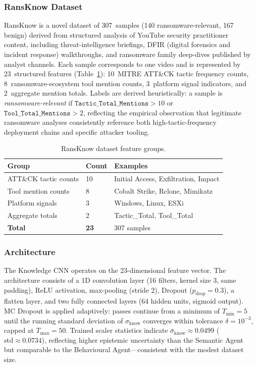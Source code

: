 \documentclass[journal]{IEEEtran}
\newcommand{\know}{\mathrm{know}}
\begin{document}
\subsubsection{RansKnow Dataset}
RansKnow is a novel dataset of 307~samples (140 ransomware-relevant,
167 benign) derived from structured analysis of YouTube security
practitioner content, including threat-intelligence briefings, DFIR
(digital forensics and incident response) walkthroughs, and
ransomware family deep-dives published by analyst channels.
Each sample corresponds to one video and is represented by
23~structured features (Table~\ref{tab:ransknow_features}):
10~MITRE ATT\&CK tactic frequency counts, 8~ransomware-ecosystem
tool mention counts, 3~platform signal indicators, and 2~aggregate
mention totals.
Labels are derived heuristically:
a sample is \emph{ransomware-relevant} if
$\texttt{Tactic\_Total\_Mentions} > 10$ or
$\texttt{Tool\_Total\_Mentions} > 2$,
reflecting the empirical observation that legitimate ransomware
analyses consistently reference both high-tactic-frequency deployment
chains and specific attacker tooling.

\begin{table}[t]
\centering
\caption{RansKnow dataset feature groups.}
\label{tab:ransknow_features}
\begin{tabular}{lll}
\toprule
\textbf{Group} & \textbf{Count} & \textbf{Examples} \\
\midrule
ATT\&CK tactic counts & 10 &
  Initial Access, Exfiltration, Impact \\
Tool mention counts   & 8  &
  Cobalt Strike, Rclone, Mimikatz \\
Platform signals      & 3  &
  Windows, Linux, ESXi \\
Aggregate totals      & 2  &
  Tactic\_Total, Tool\_Total \\
\midrule
\textbf{Total} & \textbf{23} & 307 samples \\
\bottomrule
\end{tabular}
\end{table}

\subsubsection{Architecture}
The Knowledge CNN operates on the 23-dimensional feature vector.
The architecture consists of a 1D convolution layer
(16 filters, kernel size 3, same padding), ReLU activation,
max-pooling (stride 2), Dropout ($p_{\mathrm{drop}}=0.3$), a
flatten layer, and two fully connected layers
(64 hidden units, sigmoid output).
MC Dropout is applied adaptively: passes continue from a minimum of
$T_{\min}=5$ until the running standard deviation of
$\sigma_{\know}$ converges within tolerance $\delta=10^{-3}$,
capped at $T_{\max}=50$.
Trained scaler statistics indicate
$\bar{\sigma}_{\know} \approx 0.0499$ ($\mathrm{std}\approx 0.0734$),
reflecting higher epistemic uncertainty than the Semantic Agent but
comparable to the Behavioural Agent---consistent with the modest
dataset size.
\end{document}
